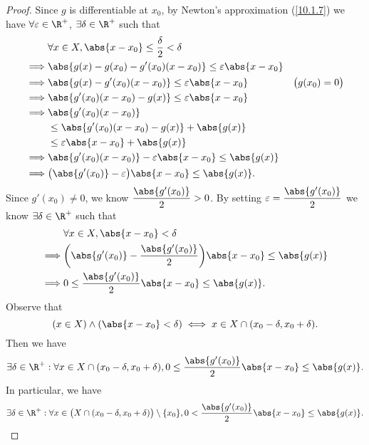 \begin{proof}
  Since \(g\) is differentiable at \(x_0\), by Newton's approximation (\cref{10.1.7}) we have \(\forall \varepsilon \in \R^+\), \(\exists \delta \in \R^+\) such that
  \begin{align*}
             & \forall x \in X, \abs{x - x_0} \leq \dfrac{\delta}{2} < \delta                               \\
    \implies & \abs{g(x) - g(x_0) - g'(x_0)(x - x_0)} \leq \varepsilon \abs{x - x_0}                        \\
    \implies & \abs{g(x) - g'(x_0)(x - x_0)} \leq \varepsilon \abs{x - x_0}          & \big(g(x_0) = 0\big) \\
    \implies & \abs{g'(x_0)(x - x_0) - g(x)} \leq \varepsilon \abs{x - x_0}                                 \\
    \implies & \abs{g'(x_0)(x - x_0)}                                                                       \\
             & \leq \abs{g'(x_0)(x - x_0) - g(x)} + \abs{g(x)}                                              \\
             & \leq \varepsilon \abs{x - x_0} + \abs{g(x)}                                                  \\
    \implies & \abs{g'(x_0)(x - x_0)} - \varepsilon \abs{x - x_0} \leq \abs{g(x)}                           \\
    \implies & \big(\abs{g'(x_0)} - \varepsilon\big)\abs{x - x_0} \leq \abs{g(x)}.
  \end{align*}
  Since \(g'(x_0) \neq 0\), we know \(\dfrac{\abs{g'(x_0)}}{2} > 0\).
  By setting \(\varepsilon = \dfrac{\abs{g'(x_0)}}{2}\) we know \(\exists \delta \in \R^+\) such that
  \begin{align*}
             & \forall x \in X, \abs{x - x_0} < \delta                                            \\
    \implies & \bigg(\abs{g'(x_0)} - \dfrac{\abs{g'(x_0)}}{2}\bigg) \abs{x - x_0} \leq \abs{g(x)} \\
    \implies & 0 \leq \dfrac{\abs{g'(x_0)}}{2} \abs{x - x_0} \leq \abs{g(x)}.
  \end{align*}
  Observe that
  \[
    (x \in X) \land (\abs{x - x_0} < \delta) \iff x \in X \cap (x_0 - \delta, x_0 + \delta).
  \]
  Then we have
  \[
    \exists \delta \in \R^+ : \forall x \in X \cap (x_0 - \delta, x_0 + \delta), 0 \leq \dfrac{\abs{g'(x_0)}}{2} \abs{x - x_0} \leq \abs{g(x)}.
  \]
  In particular, we have
  \[
    \exists \delta \in \R^+ : \forall x \in \big(X \cap (x_0 - \delta, x_0 + \delta)\big) \setminus \{x_0\}, 0 < \dfrac{\abs{g'(x_0)}}{2} \abs{x - x_0} \leq \abs{g(x)}.
\]
\end{proof}
